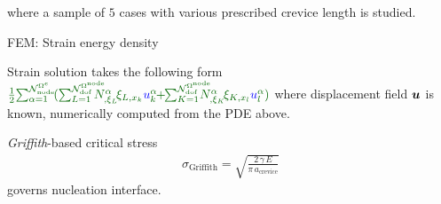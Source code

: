 \documentclass[25pt, a0paper,
portrait,
margin=2mm, 
innermargin=2mm, 
blockverticalspace=7mm, %
colspace=2mm, %
subcolspace=0mm]{tikzposter}
\makeatletter
\newcommand*{\inputfig}[3][htb]{{
    \def\fps@figure{#1}
    \def\DIR{#2}
    \def\LABEL{#3}
    \graphicspath{{\DIR/}}
    
}}
\makeatother
\begin{document}
{\begin{minipage}{0.54\textwidth}
\begin{minipage}{0.7\textwidth}
\begin{mdframed}
				\vspace{-0.5cm}
				where a sample of $5$ cases with various prescribed crevice length is studied.
			\end{mdframed}
		\end{minipage}
		\hfill 
		\begin{minipage}{0.3\textwidth}
			\begin{mdframed}
				FEM: Strain energy density
				\vspace{0.3cm}
				\inputfig{floats/griffith_flowchart_circle_formula}{griffith_flowchart_circle_formula}
				{\small Strain solution takes the following form}\\
				\small{
				$  \textcolor[rgb]{0,0.4,0}
					{
					\frac{1}{2}
					\!
					\sum_{\alpha=1}^{\mathcal{N}_{\text{node}}^{\Omega^{e}}} 
					\!
					( 
					\sum_{L=1}^{\mathcal{N}_{\text{dof}}^{\Omega^{\text{node}}}} 
					\!\!\!\!\!\!\! N^{\alpha}_{,\xi_{L}}\! \xi_{L,x_{k}} \textcolor[rgb]{0,0,1}{u}_{k}^{\alpha}
					\!\!+\!\! 
					\sum_{K=1}^{\mathcal{N}_{\text{dof}}^{\Omega^{\text{node}}}} 
					\!\!\!\!\!\!\! N^{\alpha}_{,\xi_{K}}\! \xi_{K,x_{l}} \textcolor[rgb]{0,0,1}{u}_{l}^{\alpha}
					)
					}
				$
				\vspace{0.1cm}
				}
				where displacement field ${\boldsymbol{\mathnormal u}}$ is known, numerically computed from the PDE above.
			\end{mdframed}
			\begin{mdframed}
				\textit{Griffith}-based critical stress
				\begin{align*}
					\sigma_{\text{Griffith}} = \sqrt{\frac{2\, \gamma \, E}{\pi \, a_{\text{crevice}}}}
				\end{align*}
				governs nucleation interface.
			\end{mdframed}
		\end{minipage}

\end{minipage}}
\end{document}
